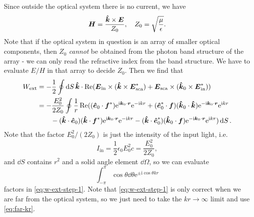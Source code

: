 \documentclass[hyperref, a4paper]{article}
\newcommand*{\ii}{\mathrm{i}}
\newcommand*{\ee}{\mathrm{e}}
\begin{document}
Since outside the optical system there is no current, we have 
\begin{equation}
    \vb*{H} = \frac{\vu*{k} \times \vb*{E}}{Z_0}, \quad Z_0 = \sqrt{\frac{\mu}{\epsilon}}.
\end{equation}
Note that if the optical system in question is an array of smaller optical components, 
then $Z_0$ \emph{cannot} be obtained from the photon band structure of the array 
- we can only read the refractive index from the band structure. 
We have to evaluate $E / H$ in that array to decide $Z_0$.
Then we find that 
\begin{equation}
    \begin{aligned}
        W_\text{ext} &= - \frac{1}{2} \oint \dd{S} \vu*{k} \cdot 
            \Re (\vb*{E}_\text{in} \times (\vu*{k} \times \vb*{E}_\text{sca}^*) + \vb*{E}_\text{sca} \times (\vu*{k}_0 \times \vb*{E}_\text{in}^*)) \\
        &= - \frac{E_0^2}{2 Z_0} \oint \frac{1}{r} \Re (
        (\vu*{e}_0 \cdot \vb*{f}^* ) \ee^{\ii \vb*{k}_0 \cdot \vb*{r}} \ee^{- \ii k r} 
        + (\vu*{e}^*_0 \cdot \vb*{f}) (\vu*{k}_0 \cdot \vu*{k}) \ee^{- \ii \vb*{k}_0 \cdot \vb*{r}} \ee^{\ii k r} \\
        &\quad \quad  - (\vu*{k} \cdot \vu*{e}_0) (\vu*{k} \cdot \vb*{f}^*) \ee^{\ii \vb*{k}_0 \cdot \vb*{r}} \ee^{- \ii k r} 
         - (\vu*{k} \cdot \vu*{e}_0^*) (\vu*{k}_0 \cdot \vb*{f}) \ee^{- \ii \vb*{k}_0 \cdot \vb*{r}} \ee^{\ii k r}  ) \dd{S}.
    \end{aligned}
    \label{eq:w-ext-step-1}
\end{equation}
Note that the factor $E_0^2 / (2 Z_0)$ is just the intensity of the input light, i.e. 
\begin{equation}
    I_\text{in} = \frac{1}{2} \epsilon_0 E_0^2 c = \frac{E_0^2}{2 Z_0},
\end{equation}
and $\dd{S}$ contains $r^2$ and a solid angle element $\dd{\Omega}$, so we can evaluate   
\[
    \int_{-\pi}^\pi \cos \theta \dd{\theta} \ee^{\pm \ii \cos \theta k r}
\]
factors in \eqref{eq:w-ext-step-1}. Note that \eqref{eq:w-ext-step-1} is only correct when we are 
far from the optical system, so we just need to take the $kr \to \infty$ limit and use \eqref{eq:far-kr}.
\end{document}
